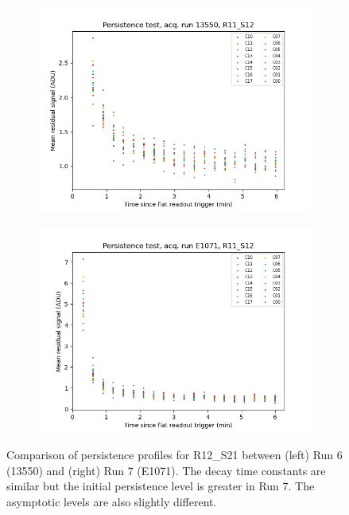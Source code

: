 \begin{figure}[ht]
\centering
\begin{subfigure}{0.5\textwidth}
  \centering
  \includegraphics[width=1.0\textwidth]{figures/baselineCharacterization/persistence_plot_LSSTCam_R11_S12_u_lsstccs_eo_persistence_13550_w_2023_41_20231117T001459Z.png}
\end{subfigure}%
\begin{subfigure}{0.5\textwidth}
  \centering
  \includegraphics[width=1\textwidth]{figures/baselineCharacterization/persistence_plot_LSSTCam_R11_S12_u_lsstccs_eo_persistence_E1071_w_2024_35_20240925T180602Z.png}
\end{subfigure}
\caption{Comparison of persistence profiles for R12\_S21 between (left) Run 6 (13550) and (right) Run 7 (E1071).  The decay time constants are similar but the initial persistence level is greater in Run 7.  The asymptotic levels are also slightly different.}
\label{fig:persistence-decay-comp}
\end{figure}

